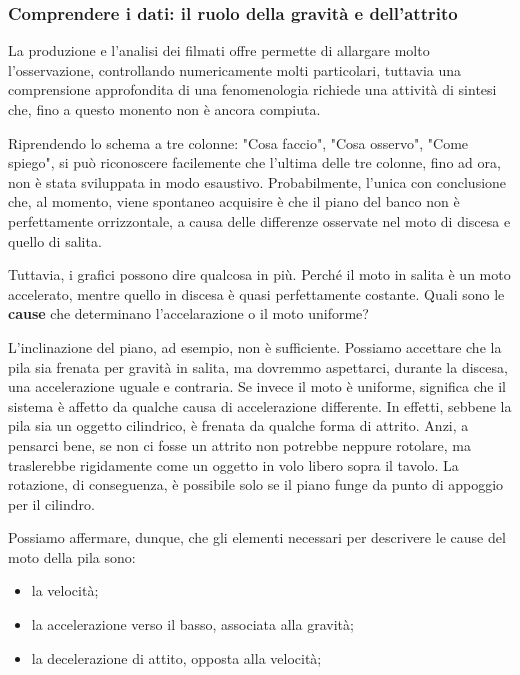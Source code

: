 \subsubsection*{Comprendere i dati: il ruolo della gravità e dell'attrito}

La produzione e l'analisi dei filmati offre permette di allargare molto l'osservazione,  controllando numericamente molti particolari, tuttavia una comprensione approfondita di una fenomenologia richiede una attività di sintesi che, fino a questo monento non è ancora compiuta.\newline

Riprendendo lo schema a tre colonne: "Cosa faccio", "Cosa osservo", "Come spiego", si può riconoscere facilemente che l'ultima delle tre colonne, fino ad ora, non è stata sviluppata in modo esaustivo.\newline
Probabilmente, l'unica con conclusione che, al momento, viene spontaneo acquisire è che il piano del banco non è perfettamente orrizzontale, a causa delle differenze osservate nel moto di discesa e quello di salita.\newline

Tuttavia, i grafici possono dire qualcosa in più. Perché il moto in salita è un moto accelerato, mentre quello in discesa è quasi perfettamente costante. Quali sono le {\bf cause} che determinano l'accelarazione o il moto uniforme?\newline

L'inclinazione del piano, ad esempio, non è sufficiente. Possiamo accettare che la pila sia frenata per gravità in salita, ma dovremmo aspettarci, durante la discesa, una accelerazione uguale e contraria. Se invece il moto è uniforme, significa che il sistema è affetto da qualche causa di accelerazione differente. In effetti, sebbene la pila sia un oggetto cilindrico, è frenata da qualche forma di attrito. Anzi, a pensarci bene, se non ci fosse un attrito non potrebbe neppure rotolare, ma traslerebbe rigidamente come un oggetto in volo libero sopra il tavolo. La rotazione, di conseguenza, è possibile solo se il piano funge da punto di appoggio per il cilindro.\newline

Possiamo affermare, dunque, che gli elementi necessari per descrivere le cause del moto della pila sono:\newline
\begin{itemize}
\item {la velocità;}
\item {la accelerazione verso il basso, associata alla gravità;}
\item {la decelerazione di attito, opposta alla velocità;}
\end{itemize}

